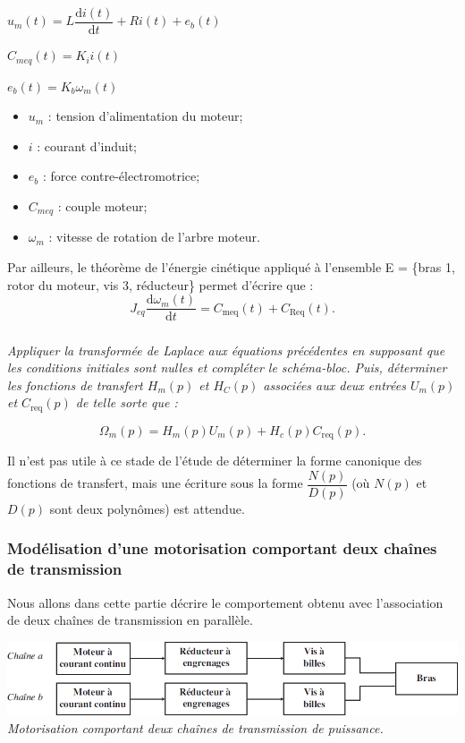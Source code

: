 \documentclass[10pt,fleqn]{article} %
\begin{document}
\noindent
\begin{minipage}{.48\linewidth}
$u_m(t)=L\dfrac{\text{d}i(t)}{\text{d}t}+Ri(t)+e_b(t)$ 

$C_{meq}(t)=K_i i(t)$ 

$e_b(t)=K_b\omega_m(t)$
\end{minipage} \hfill
\begin{minipage}{.48\linewidth}
\begin{itemize} 
\item $u_m$ : tension d'alimentation du moteur;
\item $i$ : courant d’induit;
\item $e_b$ : force contre-électromotrice;
\item $C_{meq}$ : couple moteur;
\item $\omega_m$ : vitesse de rotation de l’arbre moteur.
\end{itemize}
\end{minipage}


Par ailleurs, le théorème de l'énergie cinétique appliqué  à l’ensemble E = \{bras 1, rotor du moteur, vis 3, réducteur\} permet d'écrire que :
$$
J_{eq}\dfrac{\text{d}\omega_m(t)}{\text{d} t}=C_{\text{meq}}(t)+C_{\text{Req}}(t).
$$

\subparagraph{}
\textit{Appliquer la transformée de Laplace aux équations précédentes en supposant que les conditions
initiales sont nulles et compléter le schéma-bloc. Puis, déterminer
les fonctions de transfert $H_m(p)$ et $H_C(p)$ associées aux deux entrées $U_m(p)$ et $C_{\text{req}}(p)$ de telle sorte
que :}

$$
\Omega_m(p)=H_m(p)U_m(p)+H_c(p)C_{\text{req}}(p).
$$

Il n’est pas utile à ce stade de l’étude de déterminer  la forme canonique des fonctions de transfert, mais une écriture sous la forme $\dfrac{N(p)}{D(p)}$  (où $N(p)$ et $D(p)$ sont deux polynômes) est attendue.

\subsubsection{Modélisation d’une motorisation comportant deux chaînes de transmission}
Nous allons dans cette partie décrire le comportement obtenu avec l’association de deux chaînes de transmission en parallèle.

\begin{center}
\includegraphics[width=\linewidth]{images_01/fig_06}
\textit{Motorisation comportant deux chaînes de transmission de puissance.}
\end{center}
\end{document}
